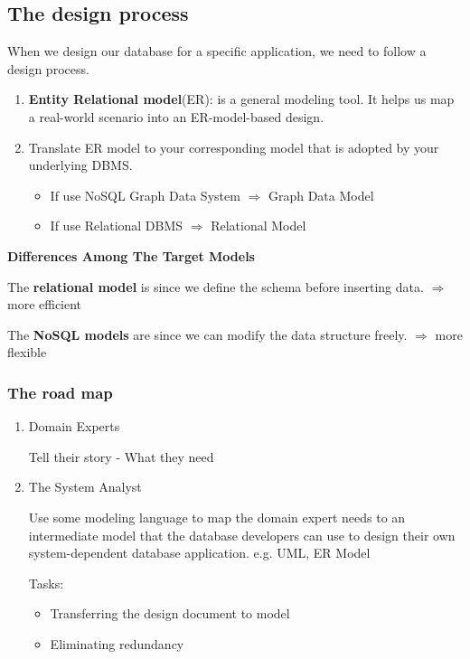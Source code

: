 \documentclass{ainote}
\begin{document}
\subsection{The design process}
When we design our database for a specific application, we need to follow a design process.
\begin{enumerate}
    \item \textbf{Entity Relational model}(ER): is a general modeling tool. It helps us map a real-world scenario into an ER-model-based design.
    
    \item Translate ER model to your corresponding model that is adopted by your underlying DBMS.
        \begin{itemize}
            \item If use NoSQL Graph Data System $\Longrightarrow$ Graph Data Model
            \item If use Relational DBMS $\Longrightarrow$ Relational Model
        \end{itemize}
\end{enumerate}
\begin{info}
    \textbf{Differences Among The Target Models}

    The \textbf{relational model} is  since we define the schema before inserting data. $\Longrightarrow$ more efficient

    The \textbf{NoSQL models} are  since we can modify the data structure freely. $\Longrightarrow$ more flexible
\end{info}
\subsubsection{The road map}
\begin{enumerate}
    \item Domain Experts

    Tell their story - What they need
    \item The System Analyst

    Use some modeling language to map the domain expert needs to an intermediate model that the database developers can use to design their own system-dependent database application.
    e.g. UML, ER Model

    Tasks:
    \begin{itemize}
        \item Transferring the design document to model
        \item Eliminating redundancy
    \end{itemize}
\end{enumerate}
\end{document}
